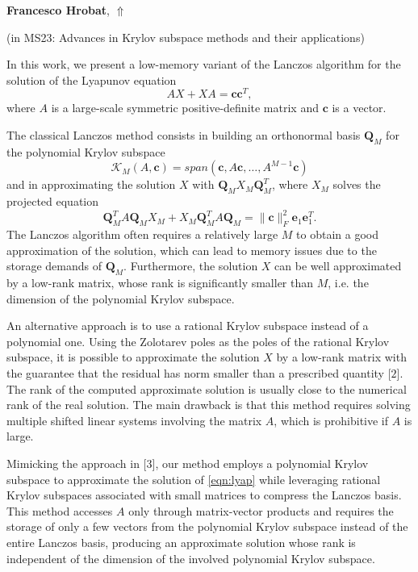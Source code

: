 \documentclass[ILAS2025-program.tex]{subfiles}
\begin{document}
     \hypertarget{down0239}{}\begin{ilasabstract}
    
    \textbf{Francesco Hrobat},  \hfill \hyperlink{up0239}{$\Uparrow$}
    
    (in {\color{mstitle}MS23: Advances in Krylov subspace methods and their applications})
        
        \mtskip
    In this work, we present a low-memory variant of the Lanczos algorithm for the solution of the Lyapunov equation
\begin{equation}\label{eqn:lyap}
AX + XA = \boldsymbol{c}\boldsymbol{c}^T,    
\end{equation}
where $A$ is a large-scale symmetric positive-definite matrix and $\boldsymbol{c}$ is a vector. 

The classical Lanczos method consists in building an orthonormal basis $\mathbf{Q}_M$ for the polynomial Krylov subspace
\[ \mathcal{K}_M(A,\boldsymbol{c}) = span(\boldsymbol{c},A\boldsymbol{c}, \dots, A^{M-1}\boldsymbol{c}) \]
and in approximating the solution $X$ with $\mathbf{Q}_MX_M\mathbf{Q}_M^T$, where $X_M$ solves the projected equation
\[ \mathbf{Q}_M^TA\mathbf{Q}_M X_M + X_M\mathbf{Q}_M^TA\mathbf{Q}_M = \| \boldsymbol{c} \|_F^2\boldsymbol{e}_1\boldsymbol{e}_1^T.\]
The Lanczos algorithm often requires a relatively large $M$ to obtain a good approximation of the solution, which can lead to memory issues due to the storage demands of $\mathbf{Q}_M$. Furthermore, the solution $X$ can be well approximated by a low-rank matrix, whose rank is significantly smaller than $M$, i.e. the dimension of the polynomial Krylov subspace. 

An alternative approach is to use a rational Krylov subspace instead of a polynomial one. Using the Zolotarev poles as the poles of the rational Krylov subspace, it is possible to approximate the solution $X$ by a low-rank matrix with the guarantee that the residual has norm smaller than a prescribed quantity [$2$]. The rank of the computed approximate solution is usually close to the numerical rank of the real solution. The main drawback is that this method requires solving multiple shifted linear systems involving the matrix $A$, which is prohibitive if $A$ is large. 

Mimicking the approach in [$3$], our method employs a polynomial Krylov subspace to approximate the solution of \eqref{eqn:lyap} while leveraging rational Krylov subspaces associated with small matrices to compress the Lanczos basis. This method accesses $A$ only through matrix-vector products and requires the storage of only a few vectors from the polynomial Krylov subspace instead of the entire Lanczos basis, producing an approximate solution whose rank is independent of the dimension of the involved polynomial Krylov subspace.


\end{ilasabstract}
\end{document}
